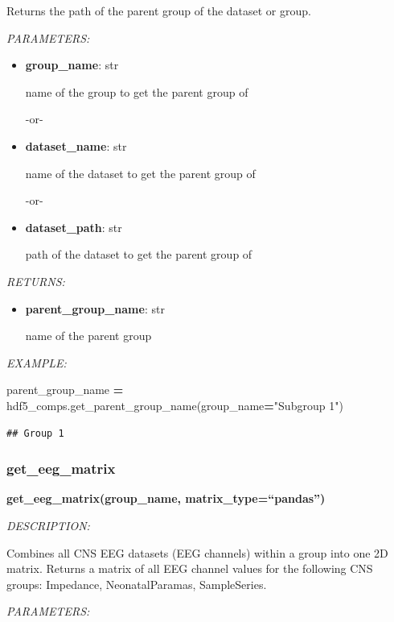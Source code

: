 \documentclass[
]{article}
\newenvironment{Shaded}{\begin{snugshade}}{\end{snugshade}}
\newcommand{\NormalTok}[1]{#1}
\newcommand{\OperatorTok}[1]{\textcolor[rgb]{0.81,0.36,0.00}{\textbf{#1}}}
\newcommand{\StringTok}[1]{\textcolor[rgb]{0.31,0.60,0.02}{#1}}
\begin{document}
Returns the path of the parent group of the dataset or group.

\emph{PARAMETERS:}

\begin{itemize}
\item
  \textbf{group\_name}: str

  name of the group to get the parent group of

  -or-
\item
  \textbf{dataset\_name}: str

  name of the dataset to get the parent group of

  -or-
\item
  \textbf{dataset\_path}: str

  path of the dataset to get the parent group of
\end{itemize}

\emph{RETURNS:}

\begin{itemize}
\item
  \textbf{parent\_group\_name}: str

  name of the parent group
\end{itemize}

\emph{EXAMPLE:}

\begin{Shaded}
\begin{Highlighting}[]
\NormalTok{parent_group_name }\OperatorTok{=}\NormalTok{ hdf5_comps.get_parent_group_name(group_name}\OperatorTok{=}\StringTok{"Subgroup 1"}\NormalTok{)}
\end{Highlighting}
\end{Shaded}

\begin{verbatim}
## Group 1
\end{verbatim}

\hypertarget{get_eeg_matrix}{%
\subsubsection{get\_eeg\_matrix}\label{get_eeg_matrix}}

\textbf{get\_eeg\_matrix(group\_name, matrix\_type=``pandas'')}

\emph{DESCRIPTION:}

Combines all CNS EEG datasets (EEG channels) within a group into one 2D matrix. Returns a matrix of all EEG channel values for the following CNS groups: Impedance, NeonatalParamas, SampleSeries.

\emph{PARAMETERS:}
\end{document}

